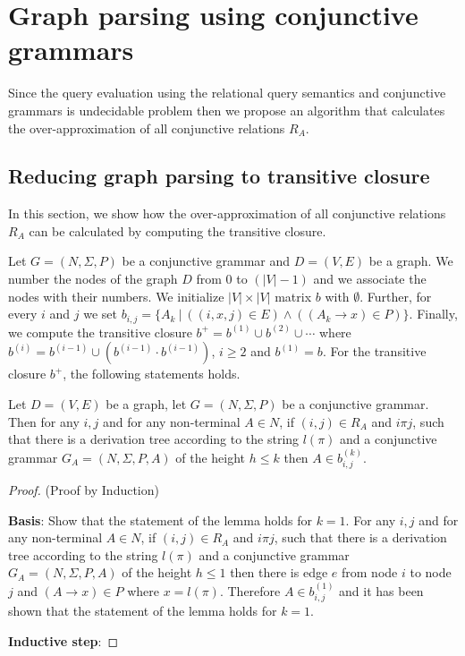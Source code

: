 \section{Graph parsing using conjunctive grammars}
Since the query evaluation using the relational query semantics and conjunctive grammars is undecidable problem then we propose an algorithm that calculates the over-approximation of all conjunctive relations $R_A$.

\subsection{Reducing graph parsing to transitive closure} \label{section_reducing_conj}
In this section, we show how the over-approximation of all conjunctive relations $R_A$ can be calculated by computing the transitive closure.

Let $G = (N,\Sigma,P)$ be a conjunctive grammar and $D = (V, E)$ be a graph. We number the nodes of the graph $D$ from 0 to $(|V| - 1)$ and we associate the nodes with their numbers. We initialize $|V| \times |V|$ matrix $b$ with $\emptyset$. Further, for every $i$ and $j$ we set $b_{i,j} = \{A_k~|~((i,x,j) \in E) \wedge ((A_k \rightarrow x) \in P)\}$. Finally, we compute the transitive closure $b^+ = b^{(1)} \cup b^{(2)} \cup \cdots$ where $b^{(i)} = b^{(i-1)} \cup (b^{(i-1)} \cdot b^{(i-1)})$, $i \ge 2$ and $b^{(1)} = b$. For the transitive closure $b^+$, the following statements holds.

\begin{lemma}
Let $D = (V,E)$ be a graph, let $G =(N,\Sigma,P)$ be a conjunctive grammar. Then for any $i, j$ and for any non-terminal $A \in N$, if $(i,j) \in R_A$ and $i \pi j$, such that there is a derivation tree according to the string $l(\pi)$ and a conjunctive grammar $G_A = (N,\Sigma,P,A)$ of the height $h \leq k$ then $A \in b^{(k)}_{i,j}$.
\end{lemma}
\begin{proof}(Proof by Induction)

\textbf{Basis}: Show that the statement of the lemma holds for $k = 1$. For any $i, j$ and for any non-terminal $A \in N$, if $(i,j) \in R_A$ and $i \pi j$, such that there is a derivation tree according to the string $l(\pi)$ and a conjunctive grammar $G_A = (N,\Sigma,P,A)$ of the height $h \leq 1$ then there is edge $e$ from node $i$ to node $j$ and $(A \rightarrow x) \in P$ where $x = l(\pi)$. Therefore $A \in b^{(1)}_{i,j}$ and it has been shown that the statement of the lemma holds for $k = 1$.

\textbf{Inductive step}:
\end{proof}

